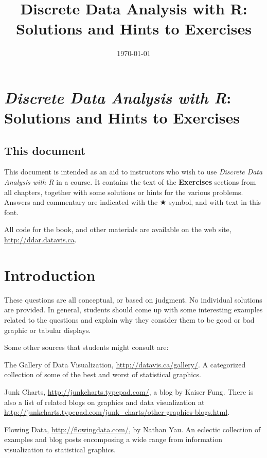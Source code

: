 \documentclass[10pt]{report}\usepackage[]{graphicx}\usepackage[]{color}
\title{\sffamily Discrete Data Analysis with R: \\ Solutions and Hints to Exercises}
\date{\today}
\begin{document}
\maketitle




\chapter*{\emph{Discrete Data Analysis with R}: \\ Solutions and Hints to Exercises}

{
\renewcommand{\baselinestretch}{.5}\normalsize
\sffamily\small
\tableofcontents
}

\vspace{3em}

\section*{This document}
This document is intended as an aid to instructors who wish to use
\emph{Discrete Data Analysis with R} in a course.  It contains the text
of the \textbf{Exercises} sections from all chapters, together with 
some solutions or hints for the various problems.  Answers and commentary are indicated
with the $\bigstar$ symbol, and \textsf{with text in this font}.

All \R code for the book, and other materials are available on the web site,
\url{http://ddar.datavis.ca}.

\clearpage
\chapter{Introduction}\label{ch:intro}
\begin{ans}
These questions are all conceptual, or based on judgment.  No individual solutions are provided.
In general, students should come up with some interesting examples related to the questions
and explain why they consider them to be good or bad graphic or tabular displays.

Some other sources that students might consult are:
\begin{itemize*}
  \item The Gallery of Data Visualization, \url{http://datavis.ca/gallery/}. A categorized
  collection of some of the best and worst of statistical graphics.
  \item Junk Charts, \url{http://junkcharts.typepad.com/}, a blog by Kaiser Fung.  There
  is also a list of related blogs on graphics and data visualization at
  \url{http://junkcharts.typepad.com/junk_charts/other-graphics-blogs.html}.
  \item Flowing Data, \url{http://flowingdata.com/}, by Nathan Yau. An eclectic
  collection of examples and blog posts encomposing a wide range from information visualization
  to statistical graphics.
\end{itemize*}
\end{ans}
\end{document}
